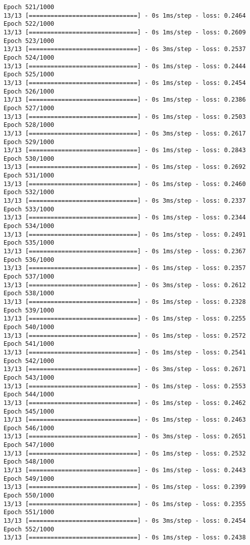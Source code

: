 \documentclass[11pt]{article}
\begin{document}
\begin{Verbatim}[commandchars=\\\{\}]
Epoch 521/1000
13/13 [==============================] - 0s 1ms/step - loss: 0.2464
Epoch 522/1000
13/13 [==============================] - 0s 1ms/step - loss: 0.2609
Epoch 523/1000
13/13 [==============================] - 0s 3ms/step - loss: 0.2537
Epoch 524/1000
13/13 [==============================] - 0s 1ms/step - loss: 0.2444
Epoch 525/1000
13/13 [==============================] - 0s 1ms/step - loss: 0.2454
Epoch 526/1000
13/13 [==============================] - 0s 1ms/step - loss: 0.2386
Epoch 527/1000
13/13 [==============================] - 0s 1ms/step - loss: 0.2503
Epoch 528/1000
13/13 [==============================] - 0s 3ms/step - loss: 0.2617
Epoch 529/1000
13/13 [==============================] - 0s 1ms/step - loss: 0.2843
Epoch 530/1000
13/13 [==============================] - 0s 1ms/step - loss: 0.2692
Epoch 531/1000
13/13 [==============================] - 0s 1ms/step - loss: 0.2460
Epoch 532/1000
13/13 [==============================] - 0s 3ms/step - loss: 0.2337
Epoch 533/1000
13/13 [==============================] - 0s 1ms/step - loss: 0.2344
Epoch 534/1000
13/13 [==============================] - 0s 1ms/step - loss: 0.2491
Epoch 535/1000
13/13 [==============================] - 0s 1ms/step - loss: 0.2367
Epoch 536/1000
13/13 [==============================] - 0s 1ms/step - loss: 0.2357
Epoch 537/1000
13/13 [==============================] - 0s 3ms/step - loss: 0.2612
Epoch 538/1000
13/13 [==============================] - 0s 1ms/step - loss: 0.2328
Epoch 539/1000
13/13 [==============================] - 0s 1ms/step - loss: 0.2255
Epoch 540/1000
13/13 [==============================] - 0s 1ms/step - loss: 0.2572
Epoch 541/1000
13/13 [==============================] - 0s 1ms/step - loss: 0.2541
Epoch 542/1000
13/13 [==============================] - 0s 3ms/step - loss: 0.2671
Epoch 543/1000
13/13 [==============================] - 0s 1ms/step - loss: 0.2553
Epoch 544/1000
13/13 [==============================] - 0s 1ms/step - loss: 0.2462
Epoch 545/1000
13/13 [==============================] - 0s 1ms/step - loss: 0.2463
Epoch 546/1000
13/13 [==============================] - 0s 3ms/step - loss: 0.2651
Epoch 547/1000
13/13 [==============================] - 0s 1ms/step - loss: 0.2532
Epoch 548/1000
13/13 [==============================] - 0s 1ms/step - loss: 0.2443
Epoch 549/1000
13/13 [==============================] - 0s 1ms/step - loss: 0.2399
Epoch 550/1000
13/13 [==============================] - 0s 1ms/step - loss: 0.2355
Epoch 551/1000
13/13 [==============================] - 0s 3ms/step - loss: 0.2454
Epoch 552/1000
13/13 [==============================] - 0s 1ms/step - loss: 0.2438

\end{Verbatim}
\end{document}
